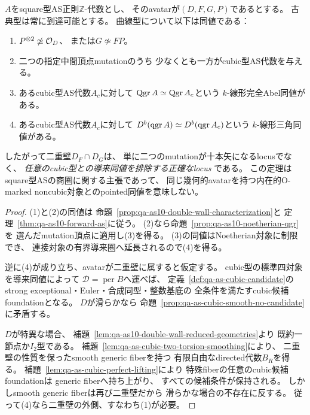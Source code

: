 \begin{theorem}[cubic型へ到達できるための必要十分条件]
\label{thm:qa-as-cubic-reachability}
$A$をsquare型AS正則$\mathbb Z$-代数とし、
そのavatarが$(D,F,G,P)$であるとする。
古典型は常に到達可能とする。
曲線型について以下は同値である：
\begin{enumerate}
\item $P^{\otimes2}\not\simeq\mathcal O_D$、
      または$G\not\simeq FP$。
\item 二つの指定中間頂点mutationのうち
      少なくとも一方がcubic型AS代数を与える。
\item あるcubic型AS代数$A_c$に対して
      $\operatorname{Qgr} A\simeq\operatorname{Qgr} A_c$という
      $k$-線形完全Abel同値がある。
\item あるcubic型AS代数$A_c$に対して
      $D^b(\operatorname{qgr} A)\simeq D^b(\operatorname{qgr} A_c)$という
      $k$-線形三角同値がある。
\end{enumerate}
したがって二重壁$D_F\cap D_G$は、
単に二つのmutationが十本矢になるlocusでなく、
\emph{任意のcubic型との導来同値を排除する正確なlocus}
である。
この定理はsquare型ASの商圏に関する主張であって、
同じ幾何的avatarを持つ内在的O-marked
noncubic対象とのpointed同値を意味しない。
\end{theorem}
\begin{proof}
(1)と(2)の同値は
命題~\ref{prop:qa-as10-double-wall-characterization}と
定理~\ref{thm:qa-as10-forward-as}に従う。
(2)なら命題~\ref{prop:qa-as10-noetherian-qgr}を
選んだmutation頂点に適用し(3)を得る。
(3)の同値はNoetherian対象に制限でき、
連接対象の有界導来圏へ延長されるので(4)を得る。

逆に(4)が成り立ち、avatarが二重壁に属すると仮定する。
cubic型の標準四対象を導来同値によって
$\mathcal D=\operatorname{per}B$へ運べば、
定義~\ref{def:qa-as-cubic-candidate}の
strong exceptional・Euler・合成同型・整数基底の
全条件を満たすcubic候補foundationとなる。
$D$が滑らかなら
命題~\ref{prop:qa-as-cubic-smooth-no-candidate}に矛盾する。

$D$が特異な場合、
補題~\ref{lem:qa-as10-double-wall-reduced-geometries}より
既約一節点か$I_2$型である。
補題~\ref{lem:qa-as-cubic-two-torsion-smoothing}により、
二重壁の性質を保ったsmooth generic fiberを持つ
有限自由なdirected代数$B_R$を得る。
補題~\ref{lem:qa-as-cubic-perfect-lifting}により
特殊fiberの任意のcubic候補foundationは
generic fiberへ持ち上がり、
すべての候補条件が保持される。
しかしsmooth generic fiberは再び二重壁だから
滑らかな場合の不存在に反する。
従って(4)なら二重壁の外側、すなわち(1)が必要。
\end{proof}


